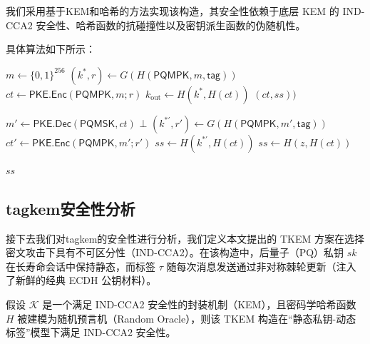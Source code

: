 我们采用基于KEM和哈希的方法实现该构造，其安全性依赖于底层 KEM 的 IND-CCA2 安全性、哈希函数的抗碰撞性以及密钥派生函数的伪随机性。                

具体算法如下所示：


\begin{algorithm}[H]
\caption{ $ \mathsf{TKEM}.\mathsf{Enc}(PK, \mathsf{tag}) $ }
\label{alg:tkem_enc}
\begin{algorithmic}[1]


\State  $ m \gets \{0,1\}^{256} $ 
\State  $ (k^*, r) \gets G(H(\mathsf{PQMPK}, m, \mathsf{tag})) $ 
\State  $ ct \gets \mathsf{PKE}.\mathsf{Enc}(\mathsf{PQMPK}, m; r) $ 
\State  $ k_{\text{out}} \gets H(k^*, H(ct)) $ 
\State \Return  $ (ct, ss)) $ 
\end{algorithmic}
\end{algorithm}

\begin{algorithm}[H]
\caption{ $ \mathsf{TKEM}.\mathsf{Dec}(SK, ct, \mathsf{tag}) $ }
\label{alg:tkem_dec}
\begin{algorithmic}[1]


\State  $ m' \gets \mathsf{PKE}.\mathsf{Dec}(\mathsf{PQMSK}, ct) $ 
    \State \Return  $ \bot $ 
\EndIf
\State  $ (k^{*\prime}, r') \gets G(H(\mathsf{PQMPK}, m', \mathsf{tag})) $ 
\State  $ ct' \gets \mathsf{PKE}.\mathsf{Enc}(\mathsf{PQMPK}, m'; r') $ 
    \State  $ ss \gets H(k^{*\prime}, H(ct)) $  
\Else
    \State  $ ss \gets H(z, H(ct)) $   
    
\EndIf
\State \Return  $ ss $ 
\end{algorithmic}
\end{algorithm}




\subsection{tagkem安全性分析}
接下去我们对tagkem的安全性进行分析，我们定义本文提出的 TKEM 方案在选择密文攻击下具有不可区分性（IND-CCA2）。在该构造中，后量子（PQ）私钥 $sk$ 在长寿命会话中保持静态，而标签 $\tau$ 随每次消息发送通过非对称棘轮更新（注入了新鲜的经典 ECDH 公钥材料）。

\begin{theorem}
假设 $\mathcal{K}$ 是一个满足 IND-CCA2 安全性的封装机制（KEM），且密码学哈希函数 $H$ 被建模为随机预言机（Random Oracle），则该 TKEM 构造在“静态私钥-动态标签”模型下满足 IND-CCA2 安全性。
\end{theorem}

